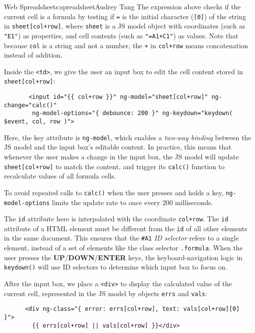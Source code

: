 \begin{aosachapter}{Web Spreadsheet}{s:spreadsheet}{Audrey Tang}
The expression above checks if the current cell is a formula by testing
if \texttt{=} is the initial character (\texttt{{[}0{]}}) of the string
in \texttt{sheet{[}col+row{]}}, where \texttt{sheet} is a JS model
object with coordinates (such as \texttt{"E1"}) as properties, and cell
contents (such as \texttt{"=A1+C1"}) as values. Note that because
\texttt{col} is a string and not a number, the \texttt{+} in
\texttt{col+row} means concatenation instead of addition.

Inside the \texttt{\textless{}td\textgreater{}}, we give the user an
input box to edit the cell content stored in
\texttt{sheet{[}col+row{]}}:

\begin{verbatim}
       <input id="{{ col+row }}" ng-model="sheet[col+row]" ng-change="calc()"
        ng-model-options="{ debounce: 200 }" ng-keydown="keydown( $event, col, row )">
\end{verbatim}

Here, the key attribute is \texttt{ng-model}, which enables a
\emph{two-way binding} between the JS model and the input box's editable
content. In practice, this means that whenever the user makes a change
in the input box, the JS model will update \texttt{sheet{[}col+row{]}}
to match the content, and trigger its \texttt{calc()} function to
recalculate values of all formula cells.

To avoid repeated calls to \texttt{calc()} when the user presses and
holds a key, \texttt{ng-model-options} limits the update rate to once
every 200 milliseconds.

The \texttt{id} attribute here is interpolated with the coordinate
\texttt{col+row}. The \texttt{id} attribute of a HTML element must be
different from the \texttt{id} of all other elements in the same
document. This ensures that the \texttt{\#A1} \emph{ID selector} refers
to a single element, instead of a set of elements like the class
selector \texttt{.formula}. When the user presses the
\textbf{UP}/\textbf{DOWN}/\textbf{ENTER} keys, the keyboard-navigation
logic in \texttt{keydown()} will use ID selectors to determine which
input box to focus on.

After the input box, we place a \texttt{\textless{}div\textgreater{}} to
display the calculated value of the current cell, represented in the JS
model by objects \texttt{errs} and \texttt{vals}:

\begin{verbatim}
      <div ng-class="{ error: errs[col+row], text: vals[col+row][0] }">
        {{ errs[col+row] || vals[col+row] }}</div>
\end{verbatim}


\end{aosachapter}

